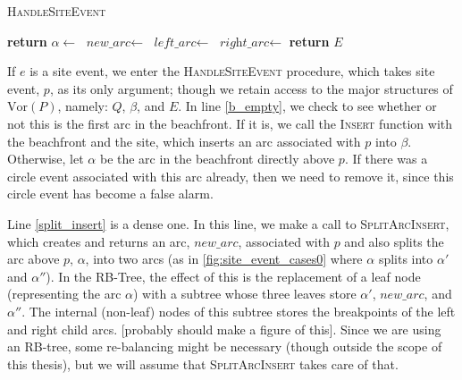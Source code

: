 \documentclass[12pt,twoside]{reedthesis}
\begin{document}
    \begin{algorithm}[H]
    \caption{\textsc{HandleSiteEvent}}\label{HandleSiteEvent}
    \begin{algorithmic}[1]
     \label{b_empty}
      \State {}
      \State \textbf{return}
    \Else
      \State $\alpha\gets$  
        \State {}
      \EndIf 
      \State $\textit{new\_arc}\gets$ \label{split_insert}
      \State $\textit{left\_arc}\gets$ \label{get_left}
      \State $\textit{right\_arc}\gets$ \label{get_right}
      \State {}  \label{add_left}
      \State {} \label{add_right}
      \State {} 
      \State {} 
    \EndIf
    \State {}
    \State \textbf{return} $E$
    \EndProcedure
    \end{algorithmic} 
    \end{algorithm}

    If $e$ is a site event, we enter the \textsc{HandleSiteEvent} procedure, which takes site event, $p$, as its only argument; though we retain access to the major structures of $\mbox{Vor}(P)$, namely: $Q$, $\beta$, and $E$. In line \ref{b_empty}, we check to see whether or not this is the first arc in the beachfront. If it is, we call the \textsc{Insert} function with the beachfront and the site, which inserts an arc associated with $p$ into $\beta$. Otherwise, let $\alpha$ be the arc in the beachfront directly above $p$. If there was a circle event associated with this arc already, then we need to remove it, since this circle event has become a false alarm.\par

    Line \ref{split_insert} is a dense one. In this line, we make a call to \textsc{SplitArcInsert}, which creates and returns an arc, $\textit{new\_arc}$, associated with $p$ and also splits the arc above $p$, $\alpha$, into two arcs (as in \cref{fig:site_event_cases0} where $\alpha$ splits into $\alpha'$ and $\alpha''$). In the RB-Tree, the effect of this is the replacement of a leaf node (representing the arc $\alpha$) with a subtree whose three leaves store $\alpha'$, $\textit{new\_arc}$, and $\alpha''$. The internal (non-leaf) nodes of this subtree stores the breakpoints of the left and right child arcs. [probably should make a figure of this]. Since we are using an RB-tree, some re-balancing might be necessary (though outside the scope of this thesis), but we will assume that \textsc{SplitArcInsert} takes care of that.\par
\end{document}
